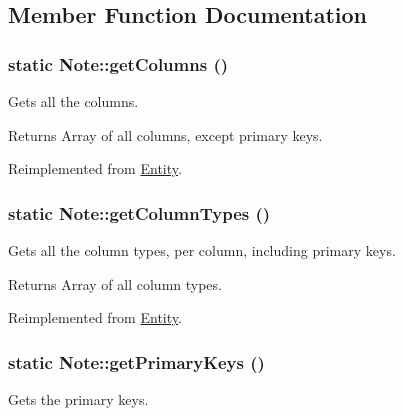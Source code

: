 \subsection{Member Function Documentation}
\hypertarget{classNote_ab602c2348fab90e66d061b62c2eb0aac}{
\subsubsection[{getColumns}]{\setlength{\rightskip}{0pt plus 5cm}static Note::getColumns ()}}
\label{classNote_ab602c2348fab90e66d061b62c2eb0aac}
Gets all the columns.

\begin{DoxyReturn}{Returns}
Array of all columns, except primary keys. 
\end{DoxyReturn}


Reimplemented from \hyperlink{classEntity_a394717a08ffd54ec9a14d06727c86719}{Entity}.

\hypertarget{classNote_afb67f78e11e21140b15735ce5a78d5ba}{
\subsubsection[{getColumnTypes}]{\setlength{\rightskip}{0pt plus 5cm}static Note::getColumnTypes ()}}
\label{classNote_afb67f78e11e21140b15735ce5a78d5ba}
Gets all the column types, per column, including primary keys.

\begin{DoxyReturn}{Returns}
Array of all column types. 
\end{DoxyReturn}


Reimplemented from \hyperlink{classEntity_ad69437219c10955803707fbf6ac458e7}{Entity}.

\hypertarget{classNote_a72d5489c580726d4fbb55359ae98db5a}{
\subsubsection[{getPrimaryKeys}]{\setlength{\rightskip}{0pt plus 5cm}static Note::getPrimaryKeys ()}}
\label{classNote_a72d5489c580726d4fbb55359ae98db5a}
Gets the primary keys.

